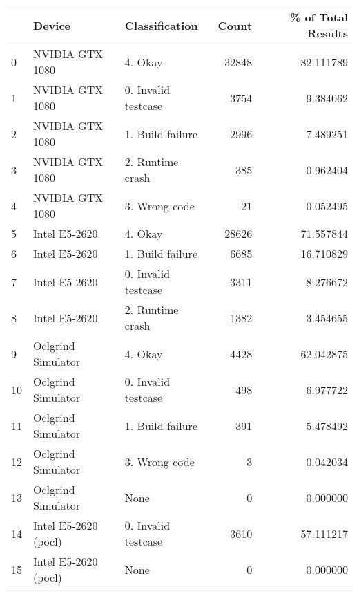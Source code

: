 \begin{tabular}{lllrr}
\toprule
{} &                Device &       Classification &  Count &  \% of Total Results \\
\midrule
0  &       NVIDIA GTX 1080 &              4. Okay &  32848 &           82.111789 \\
1  &       NVIDIA GTX 1080 &  0. Invalid testcase &   3754 &            9.384062 \\
2  &       NVIDIA GTX 1080 &     1. Build failure &   2996 &            7.489251 \\
3  &       NVIDIA GTX 1080 &     2. Runtime crash &    385 &            0.962404 \\
4  &       NVIDIA GTX 1080 &        3. Wrong code &     21 &            0.052495 \\
5  &         Intel E5-2620 &              4. Okay &  28626 &           71.557844 \\
6  &         Intel E5-2620 &     1. Build failure &   6685 &           16.710829 \\
7  &         Intel E5-2620 &  0. Invalid testcase &   3311 &            8.276672 \\
8  &         Intel E5-2620 &     2. Runtime crash &   1382 &            3.454655 \\
9  &    Oclgrind Simulator &              4. Okay &   4428 &           62.042875 \\
10 &    Oclgrind Simulator &  0. Invalid testcase &    498 &            6.977722 \\
11 &    Oclgrind Simulator &     1. Build failure &    391 &            5.478492 \\
12 &    Oclgrind Simulator &        3. Wrong code &      3 &            0.042034 \\
13 &    Oclgrind Simulator &                 None &      0 &            0.000000 \\
14 &  Intel E5-2620 (pocl) &  0. Invalid testcase &   3610 &           57.111217 \\
15 &  Intel E5-2620 (pocl) &                 None &      0 &            0.000000 \\
\bottomrule
\end{tabular}
